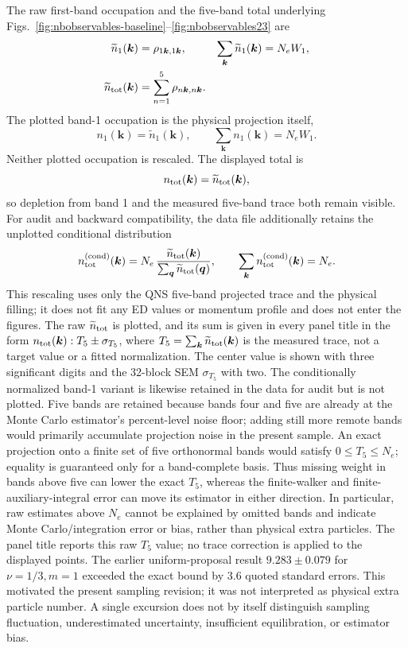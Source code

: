 The raw first-band occupation and the five-band total underlying
Figs.~\ref{fig:nbobservables-baseline}--\ref{fig:nbobservables23} are
\begin{align}
 \widetilde n_1(\bm k)&=\rho_{1\bm k,1\bm k},
 &\sum_{\bm k}\widetilde n_1(\bm k)&=N_eW_1,\\
 \widetilde n_{\rm tot}(\bm k)&=\sum_{n=1}^{5}\rho_{n\bm k,n\bm k}.
\end{align}
The plotted band-1 occupation is the physical projection itself,
\begin{equation}
 n_1(\bm k)=\widetilde n_1(\bm k),
 \qquad \sum_{\bm k}n_1(\bm k)=N_eW_1 .
\label{eq:band1-physical}
\end{equation}
Neither plotted occupation is rescaled. The displayed total is
\begin{equation}
 n_{\rm tot}(\bm k)=\widetilde n_{\rm tot}(\bm k),
\end{equation}
so depletion from band 1 and the measured five-band trace both remain visible.
For audit and backward compatibility, the data file additionally retains the
unplotted conditional distribution
\begin{equation}
 n_{\rm tot}^{\rm(cond)}(\bm k)=N_e\,
 \frac{\widetilde n_{\rm tot}(\bm k)}
 {\sum_{\bm q}\widetilde n_{\rm tot}(\bm q)},
 \qquad \sum_{\bm k}n_{\rm tot}^{\rm(cond)}(\bm k)=N_e .
\label{eq:total-normalized}
\end{equation}
This rescaling uses only the QNS five-band projected trace and the physical
filling; it does not fit any ED values or momentum profile and does not enter
the figures. The raw $\widetilde n_{\rm tot}$ is plotted, and its sum is given
in every panel title in the form
$n_{\rm tot}(\bm k):T_5\mathbin{\pm}\sigma_{T_5}$, where
$T_5=\sum_{\bm k}\widetilde n_{\rm tot}(\bm k)$ is the measured trace, not a
target value or a fitted normalization. The center value is shown with three
significant digits and the 32-block SEM $\sigma_{T_5}$ with two. The
conditionally normalized band-1
variant is likewise retained in the data for audit but is not plotted. Five
bands are retained because bands four and five are already at the
Monte Carlo estimator's percent-level noise floor; adding still more remote
bands would primarily accumulate projection noise in the present sample.
An exact projection onto a finite set of five orthonormal bands would satisfy
$0\leq T_5\leq N_e$; equality is guaranteed only for a band-complete basis.
Thus missing weight in bands above five can lower the exact $T_5$, whereas the
finite-walker and finite-auxiliary-integral error can move its estimator in
either direction. In particular, raw estimates above $N_e$ cannot be explained
by omitted bands and indicate Monte Carlo/integration error or bias, rather
than physical extra particles. The panel title reports this raw $T_5$ value; no trace correction is
applied to the displayed points. The earlier uniform-proposal result
$9.283\pm0.079$ for $\nu=1/3,m=1$ exceeded the exact bound by 3.6 quoted
standard errors. This motivated the present sampling revision; it was not
interpreted as physical extra particle number. A single excursion does not
by itself distinguish sampling fluctuation, underestimated uncertainty,
insufficient equilibration, or estimator bias.

